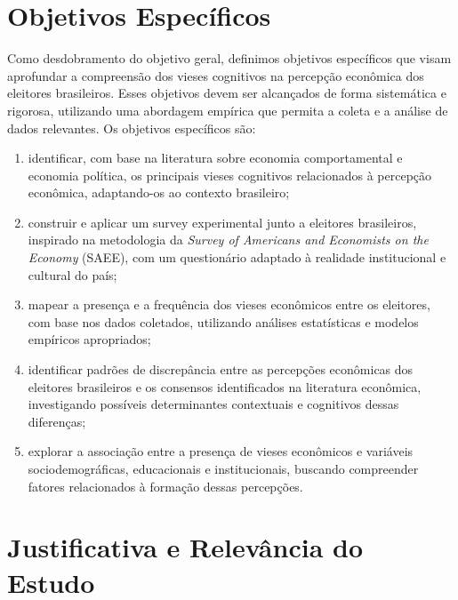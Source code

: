 \section{Objetivos Específicos}\label{sec:objetivos-especificos}


Como desdobramento do objetivo geral, definimos objetivos específicos que visam aprofundar a compreensão dos vieses cognitivos na percepção econômica dos eleitores brasileiros. Esses objetivos devem ser alcançados de forma sistemática e rigorosa, utilizando uma abordagem empírica que permita a coleta e a análise de dados relevantes. Os objetivos específicos são:

\begin{enumerate}[label=\alph*)]
    \item \label{obj:a} identificar, com base na literatura sobre economia comportamental e economia política, os principais vieses cognitivos relacionados à percepção econômica, adaptando-os ao contexto brasileiro;

    \item \label{obj:b} construir e aplicar um survey experimental junto a eleitores brasileiros, inspirado na metodologia da \textit{Survey of Americans and Economists on the Economy} (SAEE), com um questionário adaptado à realidade institucional e cultural do país;

    \item \label{obj:c} mapear a presença e a frequência dos vieses econômicos entre os eleitores, com base nos dados coletados, utilizando análises estatísticas e modelos empíricos apropriados;

    \item \label{obj:d} identificar padrões de discrepância entre as percepções econômicas dos eleitores brasileiros e os consensos identificados na literatura econômica, investigando possíveis determinantes contextuais e cognitivos dessas diferenças;

    \item \label{obj:e} explorar a associação entre a presença de vieses econômicos e variáveis sociodemográficas, educacionais e institucionais, buscando compreender fatores relacionados à formação dessas percepções.
\end{enumerate}


\section{Justificativa e Relevância do Estudo}

